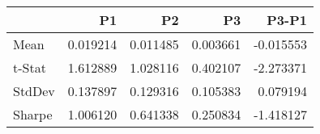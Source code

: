 \begin{tabular}{lrrrr}
\toprule
 & P1 & P2 & P3 & P3-P1 \\
\midrule
Mean & 0.019214 & 0.011485 & 0.003661 & -0.015553 \\
t-Stat & 1.612889 & 1.028116 & 0.402107 & -2.273371 \\
StdDev & 0.137897 & 0.129316 & 0.105383 & 0.079194 \\
Sharpe & 1.006120 & 0.641338 & 0.250834 & -1.418127 \\
\bottomrule
\end{tabular}
